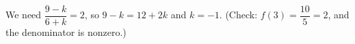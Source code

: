 We need $\dfrac{9-k}{6+k}=2$, so $9-k=12+2k$ and $k=\boxed{-1}$. (Check: $f(3)=\dfrac{10}{5}=2$, and the denominator is nonzero.)
